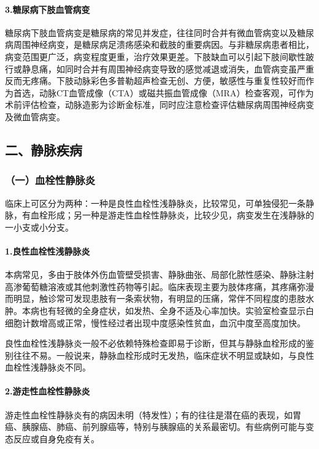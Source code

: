 \paragraph{3.糖尿病下肢血管病变}

糖尿病下肢血管病变是糖尿病的常见并发症，往往同时合并有微血管病变以及糖尿病周围神经病变，是糖尿病足溃疡感染和截肢的重要病因。与非糖尿病患者相比，病变范围更广泛，病变程度更重，治疗效果更差。下肢缺血可以引起下肢间歇性跛行或静息痛，如同时合并有周围神经病变导致的感觉减退或消失，血管病变虽严重反而无疼痛。下肢动脉彩色多普勒超声检查无创、方便，敏感性与重复性较好而作为首选，动脉CT血管成像（CTA）或磁共振血管成像（MRA）检查客观，可作为术前评估检查，动脉造影为诊断金标准，同时应注意检查评估糖尿病周围神经病变及微血管病变。

\subsection{二、静脉疾病}

\subsubsection{（一）血栓性静脉炎}

临床上可区分为两种：一种是良性血栓性浅静脉炎，比较常见，可单独侵犯一条静脉，有血栓形成；另一种是游走性血栓性静脉炎，比较少见，病变发生在浅静脉的一小支或小分支。

\paragraph{1.良性血栓性浅静脉炎}

本病常见，多由于肢体外伤血管壁受损害、静脉曲张、局部化脓性感染、静脉注射高渗葡萄糖溶液或其他刺激性药物等引起。临床表现主要为肢体疼痛，其疼痛弥漫而明显，触诊常可发现患肢有一条索状物，有明显的压痛，常伴不同程度的患肢水肿。本病也有轻微的全身症状，如发热、全身不适及心率加快。实验室检查显示白细胞计数增高或正常，慢性经过者出现中度感染性贫血，血沉中度至高度加快。

良性血栓性浅静脉炎一般不必依赖特殊检查即易于诊断，但其与静脉血栓形成的鉴别往往不易。一般说来，静脉血栓形成时无发热，临床症状不明显或缺如，与良性血栓性浅静脉炎不同。

\paragraph{2.游走性血栓性静脉炎}

游走性血栓性静脉炎有的病因未明（特发性）；有的往往是潜在癌的表现，如胃癌、胰腺癌、肺癌、前列腺癌等，特别与胰腺癌的关系最密切。有些病例可能与变态反应或自身免疫有关。

